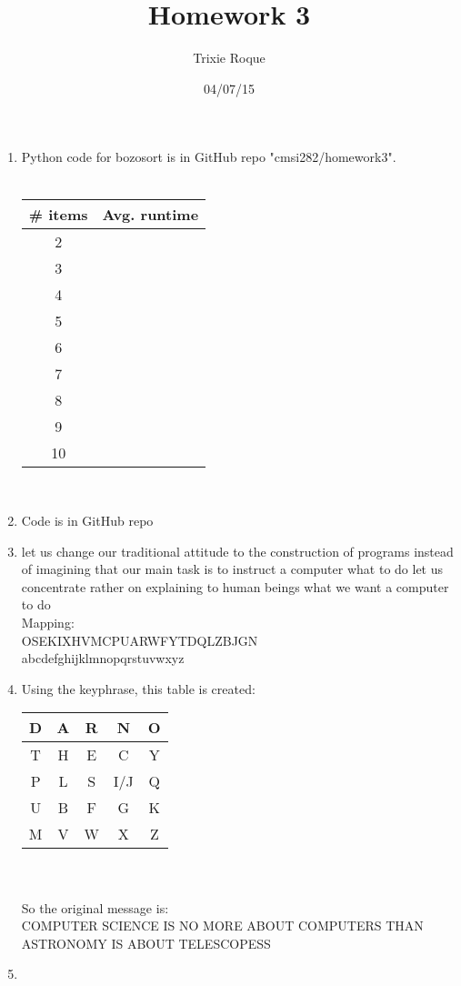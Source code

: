 \documentclass{article}
\author{Trixie Roque}
\title{Homework 3}
\date{04/07/15}
\begin{document}
\maketitle

	\begin{enumerate}
		\item
			Python code for bozosort is in GitHub repo "cmsi282/homework3". \\
			\\
			\begin{tabular} {| c | c |}
				\hline
				\# items & Avg. runtime \\ \hline
				2 & \\ \hline
				3 & \\ \hline
				4 & \\ \hline
				5 & \\ \hline
				6 & \\ \hline
				7 & \\ \hline
				8 & \\ \hline
				9 & \\ \hline
				10 & \\ \hline
			\end{tabular}
			\\
			
		\item
			Code is in GitHub repo
			\\
			
		\item
			let us change our traditional attitude to the construction of programs instead of imagining that our main task is to instruct a 			computer what to do let us concentrate rather on explaining to human beings what we want a computer to do
			\\
			Mapping: \\
			OSEKIXHVMCPUARWFYTDQLZBJGN \\
			abcdefghijklmnopqrstuvwxyz
			\\
		
		\item
			Using the keyphrase, this table is created: \\
			\begin{tabular} {| c | c | c | c | c |}
				\hline
				D & A & R & N & O \\ \hline
				T & H & E & C & Y \\ \hline
				P & L & S & I/J & Q \\ \hline
				U & B & F & G & K \\ \hline
				M & V & W & X & Z \\ \hline
			\end{tabular}
			\\
			\\
			So the original message is: \\
			COMPUTER SCIENCE IS NO MORE ABOUT COMPUTERS THAN ASTRONOMY IS ABOUT TELESCOPESS
			\\
			
		\item
		

	\end{enumerate}
\end{document}
